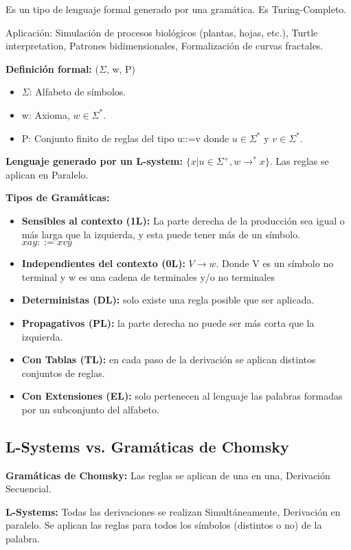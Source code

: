 Es un tipo de lenguaje formal generado por una gramática. Es Turing-Completo.

Aplicación: Simulación de procesos biológicos (plantas, hojas, etc.), Turtle interpretation, Patrones bidimensionales, Formalización de curvas fractales.

\textbf{Definición formal:} ($\Sigma$, w, P)
\begin{itemize}
    \item $\Sigma$: Alfabeto de símbolos.
    \item w: Axioma, $w \in \Sigma^*$.
    \item P: Conjunto finito de reglas del tipo u::=v donde $u \in \Sigma^*$ y $v \in \Sigma^*$.
\end{itemize}

\textbf{Lenguaje generado por un L-system:} $\{x | u \in \Sigma^+, w \rightarrow^* x\}$. Las reglas se aplican en Paralelo.

\textbf{Tipos de Gramáticas:}
\begin{itemize}
    \item \textbf{Sensibles al contexto (1L):} La parte derecha de la producción sea igual o más larga que la izquierda, y esta puede tener más de un símbolo. $xay::=xvy$
    \item \textbf{Independientes del contexto (0L):} $V \rightarrow w$. Donde V es un símbolo no terminal y w es una cadena de terminales y/o no terminales
    \item \textbf{Deterministas (DL):} solo existe una regla posible que ser aplicada.
    \item \textbf{Propagativos (PL):} la parte derecha no puede ser más corta que la izquierda.
    \item \textbf{Con Tablas (TL):} en cada paso de la derivación se aplican distintos conjuntos de reglas.
    \item \textbf{Con Extensiones (EL):} solo pertenecen al lenguaje las palabras formadas por un subconjunto del alfabeto.
\end{itemize}

\subsection{L-Systems vs. Gramáticas de Chomsky}
\textbf{Gramáticas de Chomsky:} Las reglas se aplican de una en una, Derivación Secuencial.

\textbf{L-Systems:} Todas las derivaciones se realizan Simultáneamente, Derivación en paralelo. Se aplican las reglas para todos los símbolos (distintos o no) de la palabra.

